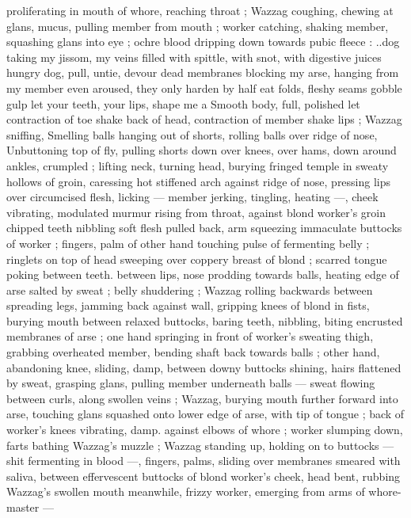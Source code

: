 proliferating in mouth of whore, reaching throat ; Wazzag coughing, 
chewing at glans, mucus, pulling member from mouth ; worker 
catching, shaking member, squashing glans into eye ; ochre blood 
dripping down towards pubic fleece :{\thd} {\gl}..dog taking my jissom, my 
veins filled with spittle, with snot, with digestive juices{\thd} hungry dog, 
pull, untie, devour dead membranes blocking my arse, hanging from 
my member{\thd} even aroused, they only harden by half{\thd} eat folds, 
fleshy seams{\td} gobble{\td} gulp{\td} let your teeth, your lips, shape me a 
Smooth body, full, polished{\thd} let contraction of toe shake back of 
head, contraction of member shake lips{\thd}{\gr} ; Wazzag sniffing, 
Smelling balls hanging out of shorts, rolling balls over ridge of nose, 
Unbuttoning top of fly, pulling shorts down over knees, over hams, 
down around ankles, crumpled ; lifting neck, turning head, burying 
fringed temple in sweaty hollows of groin, caressing hot stiffened 
arch against ridge of nose, pressing lips over circumcised flesh, 
licking --- member jerking, tingling, heating ---, cheek vibrating, 
modulated murmur rising from throat, against blond worker's groin 
chipped teeth nibbling soft flesh pulled back, arm squeezing 
immaculate buttocks of worker ; fingers, palm of other hand touching 
pulse of fermenting belly ; ringlets on top of head sweeping over 
coppery breast of blond ; scarred tongue poking between teeth. 
between lips, nose prodding towards balls, heating edge of arse 
salted by sweat ; belly shuddering ; Wazzag rolling backwards 
between spreading legs, jamming back against wall, gripping knees 
of blond in fists, burying mouth between relaxed buttocks, baring 
teeth, nibbling, biting encrusted membranes of arse ; one hand 
springing in front of worker's sweating thigh, grabbing overheated 
member, bending shaft back towards balls ; other hand, abandoning 
knee, sliding, damp, between downy buttocks shining, hairs flattened 
by sweat, grasping glans, pulling member underneath balls --- sweat 
flowing between curls, along swollen veins ; Wazzag, burying mouth 
further forward into arse, touching glans squashed onto lower edge 
of arse, with tip of tongue ; back of worker's knees vibrating, damp. 
against elbows of whore ; worker slumping down, farts bathing 
Wazzag's muzzle ; Wazzag standing up, holding on to buttocks --- 
shit fermenting in blood ---, fingers, palms, sliding over membranes 
smeared with saliva, between effervescent buttocks of blond 
worker's cheek, head bent, rubbing Wazzag's swollen mouth 
meanwhile, frizzy worker, emerging from arms of whore-master --- 
